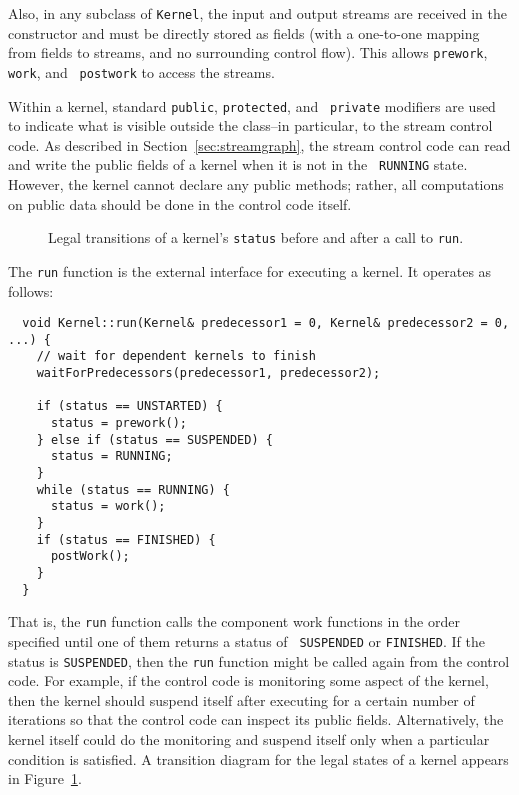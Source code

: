 Also, in any subclass of {\tt Kernel}, the input and output streams
are received in the constructor and must be directly stored as fields
(with a one-to-one mapping from fields to streams, and no surrounding
control flow).  This allows {\tt prework}, {\tt work}, and {\tt
postwork} to access the streams.

Within a kernel, standard {\tt public}, {\tt protected}, and {\tt
private} modifiers are used to indicate what is visible outside the
class--in particular, to the stream control code.  As described in
Section~\ref{sec:streamgraph}, the stream control code can read and
write the public fields of a kernel when it is not in the {\tt
RUNNING} state.  However, the kernel cannot declare any public
methods; rather, all computations on public data should be done in the
control code itself.


\begin{figure}[t]
\begin{center}
\end{center}
\vspace{-12pt}
\caption{Legal transitions of a kernel's {\tt status} before and after
a call to {\tt run}.\protect\label{fig:kernel-status}}
\end{figure}

The {\tt run} function is the external interface for executing a
kernel.  It operates as follows: 
{\small
\begin{verbatim}
  void Kernel::run(Kernel& predecessor1 = 0, Kernel& predecessor2 = 0, ...) {
    // wait for dependent kernels to finish
    waitForPredecessors(predecessor1, predecessor2);

    if (status == UNSTARTED) {
      status = prework();
    } else if (status == SUSPENDED) {
      status = RUNNING;
    }
    while (status == RUNNING) {
      status = work();
    }
    if (status == FINISHED) {
      postWork();
    }
  } 
\end{verbatim}}
That is, the {\tt run} function calls the component work functions in
the order specified until one of them returns a status of {\tt
SUSPENDED} or {\tt FINISHED}.  If the status is {\tt SUSPENDED}, then
the {\tt run} function might be called again from the control code.
For example, if the control code is monitoring some aspect of the
kernel, then the kernel should suspend itself after executing for a
certain number of iterations so that the control code can inspect its
public fields.  Alternatively, the kernel itself could do the
monitoring and suspend itself only when a particular condition is
satisfied.  A transition diagram for the legal states of a kernel
appears in Figure~\ref{fig:kernel-status}.


